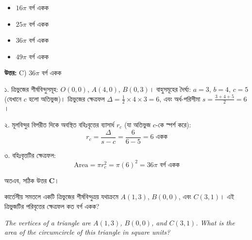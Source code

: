 \documentclass[12pt, a4paper]{article}
\begin{document}
\vspace{1em}
\begin{itemize}[label={}, leftmargin=1cm, itemsep=0.5em]
    \item[\textbf{A)}] $16\pi$ বর্গ একক
    \item[\textbf{B)}] $25\pi$ বর্গ একক
    \item[\textbf{C)}] $36\pi$ বর্গ একক
    \item[\textbf{D)}] $49\pi$ বর্গ একক
\end{itemize}

\vspace{0.5em}
\begin{tcolorbox}[answerbox]
    \textbf{\color{success} উত্তর:} C) $36\pi$ বর্গ একক
\end{tcolorbox}
\vspace{1em}

\begin{tcolorbox}[solutionbox={সমাধান (Solution)}]
    \noindent
    ১. ত্রিভুজের শীর্ষবিন্দুসমূহ: $O(0,0)$, $A(4,0)$, $B(0,3)$। 
    বাহুসমূহের দৈর্ঘ্য: $a = 3$, $b = 4$, $c = 5$ (যেখানে $c$ হলো অতিভুজ)। 
    ত্রিভুজের ক্ষেত্রফল $\Delta = \frac{1}{2} \times 4 \times 3 = 6$, এবং অর্ধ-পরিসীমা $s = \frac{3+4+5}{2} = 6$। 
    
    ২. মূলবিন্দুর বিপরীত দিকে অবস্থিত বহিঃবৃত্তের ব্যাসার্ধ $r_c$ (যা অতিভুজ $c$-কে স্পর্শ করে): 
    \[ r_c = \frac{\Delta}{s - c} = \frac{6}{6 - 5} = 6 \text{ একক} \]
    
    ৩. বহিঃবৃত্তটির ক্ষেত্রফল:
    \[ \text{Area} = \pi r_c^2 = \pi (6)^2 = 36\pi \text{ বর্গ একক} \]
    
    অতএব, সঠিক উত্তর \textbf{C}।
\end{tcolorbox}

\vspace{2em}

\begin{tcolorbox}[questionbox={প্রশ্ন (Question) 46}]
    \noindent
    কার্তেসীয় সমতলে একটি ত্রিভুজের শীর্ষবিন্দুত্রয় যথাক্রমে $A(1, 3)$, $B(0, 0)$, এবং $C(3, 1)$। এই ত্রিভুজটির পরিবৃত্তের ক্ষেত্রফল কত বর্গ একক?
    
    \vspace{0.8em}
    \begin{english}
    \noindent\textit{\color{darkgray}
    The vertices of a triangle are $A(1, 3)$, $B(0, 0)$, and $C(3, 1)$. What is the area of the circumcircle of this triangle in square units?
    }
    \end{english}
\end{tcolorbox}
\end{document}
